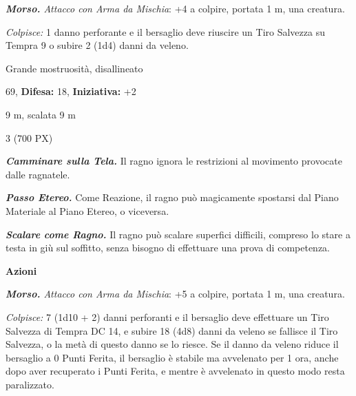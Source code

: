 \begin{multicols}{2}
{\emph{\textbf{Morso.} Attacco con Arma da Mischia}: +4 a colpire, portata 1 m, una creatura.

\emph{Colpisce:} 1 danno perforante e il bersaglio deve riuscire un Tiro Salvezza su Tempra 9 o subire 2 (1d4) danni da veleno.

\begin{description}[noitemsep, topsep=0pt, parsep=0pt, partopsep=0pt, leftmargin=0cm, labelwidth=2.2cm]
    \item[\textbf{Taglia/Tipo:}] Grande mostruosità, disallineato
    \item[\textbf{Caratt.:}] 
    \item[\textbf{Punti Ferita:}] 69,  \textbf{Difesa:} 18,  \textbf{Iniziativa:} +2
    \item[\textbf{Tiri Salvez.:}] 
    \item[\textbf{Movimento:}] 9 m, scalata 9 m
    \item[\textbf{Sfida:}] 3 (700 PX)\smallskip
\end{description}

\emph{\textbf{Camminare sulla Tela.}} Il ragno ignora le restrizioni al movimento provocate dalle ragnatele.

\emph{\textbf{Passo Etereo.}} Come Reazione, il ragno può magicamente spostarsi dal Piano Materiale al Piano Etereo, o viceversa.

\emph{\textbf{Scalare come Ragno.}} Il ragno può scalare superfici difficili, compreso lo stare a testa in giù sul soffitto, senza bisogno di effettuare una prova di competenza.

\textbf{Azioni}

\emph{\textbf{Morso.} Attacco con Arma da Mischia}: +5 a colpire, portata 1 m, una creatura.

\emph{Colpisce:} 7 (1d10 + 2) danni perforanti e il bersaglio deve effettuare un Tiro Salvezza di Tempra DC 14, e subire 18 (4d8) danni da veleno se fallisce il Tiro Salvezza, o la metà di questo danno se lo riesce. Se il danno da veleno riduce il bersaglio a 0 Punti Ferita, il bersaglio è stabile ma avvelenato per 1 ora, anche dopo aver recuperato i Punti Ferita, e mentre è avvelenato in questo modo resta paralizzato.

}
\end{multicols}
